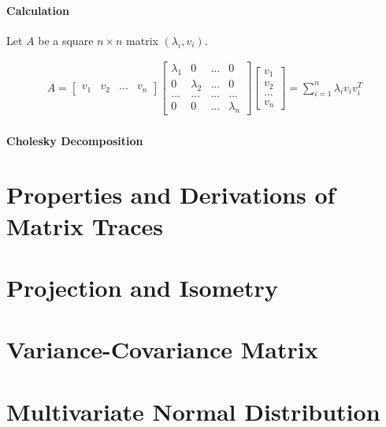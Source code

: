 \documentclass{article}
\theoremstyle{definition}
\theoremstyle{remark}
\begin{document}
\paragraph{Calculation}

Let $A$ be a square $n \times n$ matrix $(\lambda_i, v_i)$.

\begin{align*}
    A = \begin{bmatrix}
        v_1 & v_2 & ... & v_n
    \end{bmatrix} \begin{bmatrix}
        \lambda_1 & 0 & ... & 0 \\
        0 & \lambda_2 & ... & 0 \\
        ... & ... & ... & ... \\
        0 & 0 & ... & \lambda_n
    \end{bmatrix} \begin{bmatrix}
        v_1 \\ v_2 \\ ... \\ v_n \end{bmatrix} = \sum_{i=1}^{n} \lambda_i v_i v_i^T
\end{align*}

\paragraph{Cholesky Decomposition} 





\section{Properties and Derivations of Matrix Traces}

\section{Projection and Isometry}

\section{Variance-Covariance Matrix}

\section{Multivariate Normal Distribution}
\end{document}
